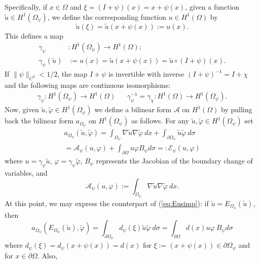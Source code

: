 \documentclass[a4paper,reqno,11pt,oneside]{amsart}
\theoremstyle{plain}
\theoremstyle{plain}
\theoremstyle{plain}
\theoremstyle{remark}
\begin{document}
Specifically, if $x\in \Omega $ and $\xi=(I+\psi)(x)=x+\psi(x)$, given a function $\tilde u\in  H^1(\Omega_\psi)$, we define the corresponding function $u\in {H^1}(\Omega)$ by
 $$
\tilde u(\xi)=\tilde u(x+\psi (x)):=u(x).
$$
This defines a map 
\begin{align*}
\gamma_\psi&:{H^1}(\Omega_{\psi})\rightarrow {H^1}(\Omega);\\
\gamma_\psi(\tilde{u})&:=u(x)=\tilde{u}(x+\psi(x))=\tilde u\circ (I+\psi)(x).
\end{align*}
If $\|\psi\|_{C^2}<1/2$, the map $I+\psi$ is invertible with inverse $(I+\psi)^{-1}=I+\chi $ and the following maps are continuous isomorphisms:
\begin{eqnarray}
 \label{gamma-psi}
\gamma_{\psi} :H^1(\Omega_{\psi})\rightarrow H^1(\Omega)
& &
\gamma_{\psi}^{-1}=\gamma_{\chi}:H^1(\Omega)\rightarrow H^1(\Omega_{\psi}).
\end{eqnarray}
Now, given $\tilde u,\tilde \varphi \in H^1(\Omega_\psi)$ we define a bilinear form $\mathcal{A}$  on $H^1(\Omega)$ by pulling back the bilinear form  $a_{\Omega_\psi} $ on $H^1(\Omega_\psi)$ as follows.
For any $\tilde u,\tilde \varphi\in H^1 (\Omega_\psi)$ set
\begin{multline}\label{def-Epsi}
    a_{\Omega_\psi}(\tilde u,\tilde \varphi)=
   \int_{ \Omega_\psi}\nabla \tilde u\nabla\tilde \varphi\  dx
    +\int_{\partial \Omega_\psi}\tilde u\tilde \varphi\ d\sigma 
    \\
    =\mathcal{A}_\psi (u,\varphi)
    +\int_{\partial \Omega} u \varphi B_\psi d\sigma =:\mathcal{E}_\psi (u,\varphi) 
\end{multline}
where $u=\gamma_{\psi}\tilde u$, $\varphi=\gamma_{\psi} \tilde \varphi$, $B_\psi$  represents the Jacobian  of the boundary change of variables, and
\begin{equation}
    \label{defA}
\mathcal{A}_\psi (u,\varphi) :=\int_{\Omega_\psi} \nabla \tilde u \nabla \tilde \varphi \ dx.  
\end{equation}
  At this point, we may express the counterpart of (\ref{eq:Eusimp}): if $\tilde u=E_{\Omega_\psi}(\tilde u)$, then
 \begin{equation}\label{eq:fond1simp}
     a_{\Omega_\psi}(E_{\Omega_\psi}(\tilde u),\tilde \varphi)=\int_{\partial {\Omega_\psi}} d_\psi(\xi) \tilde u \tilde \varphi\  d\sigma =\int_{\partial \Omega} d(x)u\varphi\ B_\psi d\sigma 
 \end{equation}
where $d_\psi(\xi)=d_\psi(x+\psi(x))=d(x)$ for $\xi:=(x+\psi(x))\in\partial\Omega_\psi$ and for $x\in \partial \Omega$. Also, 
\end{document}
